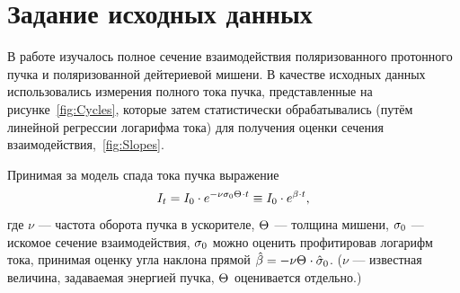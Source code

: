 \documentclass{article}
\begin{document}
	
	\singlespacing
	
	
	\tableofcontents 
	
	\onehalfspacing
	
	\section{Задание исходных данных}
	
	В работе изучалось полное сечение взаимодействия поляризованного протонного пучка и поляризованной дейтериевой мишени. В качестве исходных данных использовались измерения полного тока пучка, представленные на рисунке~\ref{fig:Cycles}, которые затем статистически обрабатывались (путём линейной регрессии логарифма тока) для получения оценки сечения взаимодействия,~\ref{fig:Slopes}. 
	
	Принимая за модель спада тока пучка выражение 
	\[
	I_t  = I_0 \cdot e^{-\nu\CS[0]\Thick \cdot t} \equiv I_0\cdot e^{\slp\cdot t},
	\]
	где $\nu$ --- частота оборота пучка в ускорителе, $\Thick$ --- толщина мишени, $\CS[0]$ --- искомое сечение взаимодействия, $\CS[0]$ можно оценить профитировав логарифм тока, принимая оценку угла наклона прямой $\slp* = -\nu\Thick\cdot \CS*[0]$. ($\nu$ --- известная величина, задаваемая энергией пучка, $\Thick$ оценивается отдельно.)
	
\end{document}
